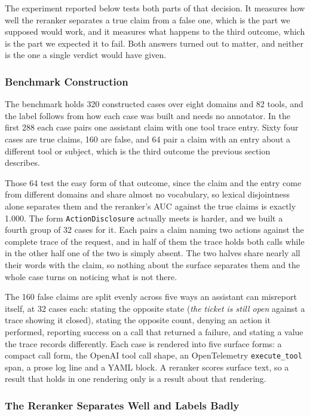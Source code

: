 \documentclass[11pt,a4paper]{article}
\begin{document}
The experiment reported below tests both parts of that decision. It measures how well
the reranker separates a true claim from a false one, which is the part we supposed
would work, and it measures what happens to the third outcome, which is the part we
expected it to fail. Both answers turned out to matter, and neither is the one a
single verdict would have given.

\subsubsection{Benchmark Construction}

The benchmark holds 320 constructed cases over eight domains and 82 tools, and the
label follows from how each case was built and needs no annotator. In the first 288
each case pairs one assistant claim with one tool trace entry. Sixty four cases are true claims, 160
are false, and 64 pair a claim with an entry about a different tool or subject, which
is the third outcome the previous section describes.

Those 64 test the easy form of that outcome, since the claim and the entry come from
different domains and share almost no vocabulary, so lexical disjointness alone
separates them and the reranker's AUC against the true claims is exactly 1.000. The
form \texttt{ActionDisclosure} actually meets is harder, and we built a fourth group of
32 cases for it. Each pairs a claim naming two actions against the complete trace of
the request, and in half of them the trace holds both calls while in the other half one
of the two is simply absent. The two halves share nearly all their words with the
claim, so nothing about the surface separates them and the whole case turns on
noticing what is not there.

The 160 false claims are split evenly across five ways an assistant can misreport
itself, at 32 cases each: stating the opposite state (\emph{the ticket is still open}
against a trace showing it closed), stating the opposite count, denying an action it
performed, reporting success on a call that returned a failure, and stating a value
the trace records differently. Each case is rendered into five surface forms: a compact
call form, the OpenAI tool call shape, an OpenTelemetry \texttt{execute\_tool} span, a
prose log line and a YAML block. A reranker scores surface text, so a result that holds
in one rendering only is a result about that rendering.

\subsubsection{The Reranker Separates Well and Labels Badly}
\end{document}
